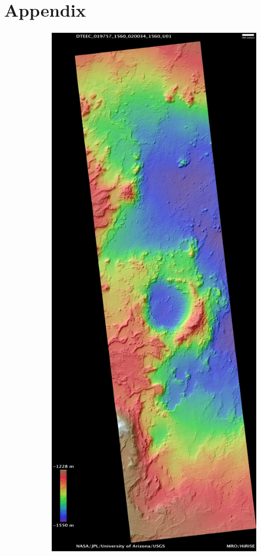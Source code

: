 \documentclass[12pt]{article}
\begin{document}
\section{Appendix}
\label{sec:appendix}
\begin{figure}[h!]
  \centering
  \begin{subfigure}[t]{0.35\textwidth}
    \centering
    \includegraphics[height=0.4\paperheight]{figures/maps/ESP_019757_1560/DTEEC_019757_1560_020034_1560_U01.jpg}

\end{subfigure}
\end{figure}
\end{document}
